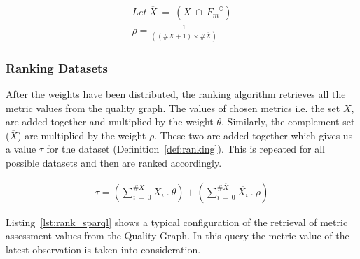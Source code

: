 \begin{Def1}
\label{def:weight_adjustment_smaller}
\begin{align*}
Let~\overline{X}~=~(X~\cap~{F_{m}}^{\complement}) \\
\rho = \frac{1}{((\#X + 1) \times \#\overline{X})}
\end{align*}
\end{Def1}

\subsubsection{Ranking Datasets}
After the weights have been distributed, the ranking algorithm retrieves all the metric values from the quality graph.
The values of chosen metrics i.e. the set $X$, are added together and multiplied by the weight $\theta$.
Similarly, the complement set ($\overline{X}$) are multiplied by the weight $\rho$.
These two are added together which gives us a value $\tau$ for the dataset (Definition~\ref{def:ranking}).
This is repeated for all possible datasets and then are ranked accordingly.
\begin{Def1}
\label{def:ranking}
\begin{align*}
\tau = (\sum_{i~=~0}^{\#X} X_{i}~.~\theta) + (\sum_{i~=~0}^{\#\overline{X}} \overline{X_{i}}~.~\rho)
\end{align*}
\end{Def1}

Listing~\ref{lst:rank_sparql} shows a typical configuration of the retrieval of metric assessment values from the Quality Graph.
In this query the metric value of the latest observation is taken into consideration.


